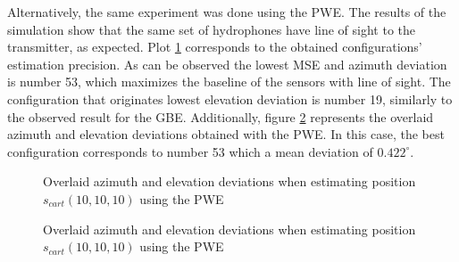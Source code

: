 Alternatively, the same experiment was done using the PWE. The results of the simulation show that the same set of hydrophones have line of sight to the transmitter, as expected. Plot \ref{fig:errors-101010-pseudo} corresponds to the obtained configurations' estimation precision. As can be observed the lowest MSE and azimuth deviation is number 53, which maximizes the baseline of the sensors with line of sight. The configuration that originates lowest elevation deviation is number 19, similarly to the observed result for the GBE. Additionally, figure \ref{fig:both-101010-pseudo} represents the overlaid azimuth and elevation deviations obtained with the PWE. In this case, the best configuration corresponds to number 53 which a mean deviation of $0.422^{\circ}$. 

\begin{figure}[!htbp]
	\captionsetup{justification=centering,margin=2cm}
	\caption{Overlaid azimuth and elevation deviations when estimating position $s_{cart}(10,10,10)$ using the PWE}
	\label{fig:errors-101010-pseudo}
\end{figure}

\begin{figure}[!h]
	\captionsetup{justification=centering,margin=2cm}
	\caption{Overlaid azimuth and elevation deviations when estimating position $s_{cart}(10,10,10)$ using the PWE}
	\label{fig:both-101010-pseudo}
\end{figure}


